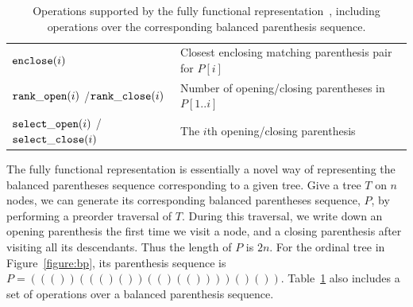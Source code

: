 \begin{table}[t]
\begin{center}
\begin{tabular} {|p{2.4cm}|p{5.2cm}|}
$\mathtt{enclose}(i)$                           &Closest enclosing matching parenthesis pair for $P[i]$ \\
$\mathtt{rank\_open}(i)$ /$\mathtt{rank\_close}(i)$       &Number of opening/closing parentheses in $P[1..i]$\\
$\mathtt{select\_open}(i)$ /$\mathtt{select\_close}(i)$   &The $i$th opening/closing parenthesis\\ \hline
\end{tabular}
\caption{Operations supported by the fully functional representation~\cite{Navarro:2014:FFS:2620785.2601073}, including operations over the corresponding balanced parenthesis sequence.}
\label{tbl:operations}
\end{center}
\end{table}

The fully functional representation is essentially a novel way of representing the balanced parentheses sequence corresponding to a given tree. 
Give a tree $T$ on $n$ nodes, we can generate its corresponding balanced parentheses sequence, $P$, by performing a preorder traversal of $T$. 
During this traversal, we write down an opening parenthesis the first time we visit a node, and a closing parenthesis after visiting all its descendants. 
Thus the length of $P$ is $2n$. 
For the ordinal tree in Figure~\ref{figure:bp}, its parenthesis sequence is $P = ((())((()())(()(())))()())$. 
Table~\ref{tbl:operations} also includes a set of operations over a balanced parenthesis sequence.%


